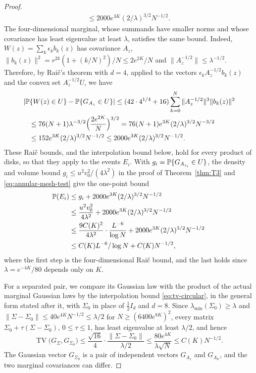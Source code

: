 \begin{proof}
\begin{align*}
 \le2000e^{3K}(2/\lambda)^{3/2}N^{-1/2}.
\end{align*}
The four-dimensional marginal, whose summands have smaller norms and
whose covariance has least eigenvalue at least $\lambda$, satisfies the
same bound. Indeed, $W(z)=\sum_k\epsilon_kb_k(z)$ has covariance $A_z$,
$\|b_k(z)\|^2=r^{2k}(1+(k/N)^2)/N\le2e^{2K}/N$ and
$\|A_z^{-1/2}\|\le\lambda^{-1/2}$. Therefore, by Rai\v{c}'s theorem
with $d=4$, applied to the vectors $\epsilon_kA_z^{-1/2}b_k(z)$ and the
convex set $A_z^{-1/2}U$, we have
\begin{align*}
 &\left|\mathbb P\{W(z)\in U\}-\mathbb P\{G_{A_z}\in U\}\right|
 \le(42\cdot4^{1/4}+16)\sum_{k=0}^N\|A_z^{-1/2}\|^3\|b_k(z)\|^3\\
 &\quad\le76(N+1)\lambda^{-3/2}\Bigl(\frac{2e^{2K}}N\Bigr)^{3/2}
 =76(N+1)e^{3K}(2/\lambda)^{3/2}N^{-3/2}\\
 &\quad\le152e^{3K}(2/\lambda)^{3/2}N^{-1/2}
 \le2000e^{3K}(2/\lambda)^{3/2}N^{-1/2}.
\end{align*}
These Rai\v{c} bounds, and the interpolation bound below, hold for every
product of disks, so that they apply to the events $E_i$.
With $g_i=\mathbb P\{G_{A_{z_i}}\in U\}$, the density and volume bound
$g_i\le u^2v_0^2/(4\lambda^2)$ in the proof of Theorem~\ref{thm:T3} and
\eqref{eq:annular-mesh-test} give the one-point bound
\begin{align}
 \mathbb P(E_i)
 &\le g_i+2000e^{3K}(2/\lambda)^{3/2}N^{-1/2}\nonumber\\
 &\le\frac{u^2v_0^2}{4\lambda^2}+2000e^{3K}(2/\lambda)^{3/2}N^{-1/2}
 \nonumber\\
 &\le\frac{9C(K)^2}{4\lambda^2}\cdot\frac{L^{-6}}{\log N}
   +2000e^{3K}(2/\lambda)^{3/2}N^{-1/2}\nonumber\\
 &\le C(K)L^{-6}/\log N+C(K)N^{-1/2},
 \label{eq:annular-jet-small-ball}
\end{align}
where the first step is the four-dimensional Rai\v{c} bound, and the last
holds since $\lambda=e^{-4K}/80$ depends only on $K$.

For a separated pair, we compare its Gaussian law with the product of the
actual marginal Gaussian laws by the interpolation bound
\eqref{eq:tv-circular}, in the general form stated after it, with
$\Sigma_0$ in place of $\tfrac12I_d$ and $d=8$.
Since $\lambda_{\min}(\Sigma_0)\ge\lambda$ and
$\|\Sigma-\Sigma_0\|\le40e^{4K}N^{-1/2}\le\lambda/2$ for
$N\ge(6400e^{8K})^2$, every matrix $\Sigma_0+\tau(\Sigma-\Sigma_0)$,
$0\le\tau\le1$, has least eigenvalue at least $\lambda/2$, and hence
\begin{equation}
 \operatorname{TV}\bigl(G_\Sigma,G_{\Sigma_0}\bigr)
 \le\frac{\sqrt{16}}4\cdot\frac{\|\Sigma-\Sigma_0\|}{\lambda/2}
 \le\frac{80e^{4K}}{\lambda\sqrt N}
 \le C(K)N^{-1/2}.\label{eq:jet-tv}
\end{equation}
The Gaussian vector $G_{\Sigma_0}$ is a pair of independent vectors
$G_{A_z}$ and $G_{A_w}$, and the two marginal covariances can differ.


\end{proof}
